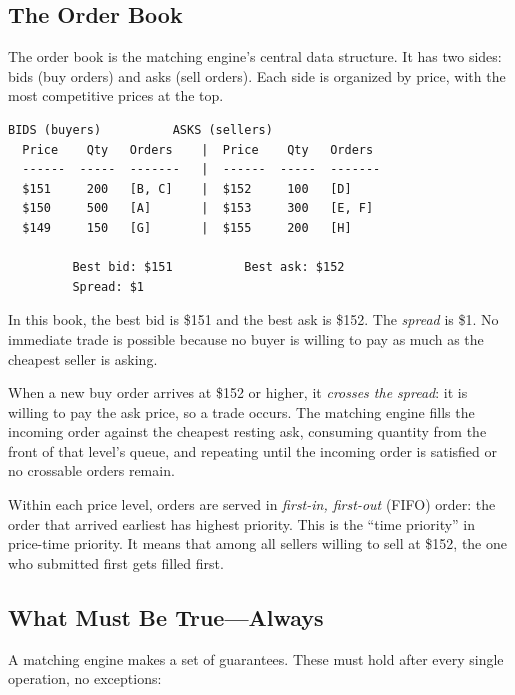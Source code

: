 \documentclass[11pt,a4paper]{article}
\begin{document}
\subsection{The Order Book}
\label{sec:book-intro}

The order book is the matching engine's central data structure. It has
two sides: bids (buy orders) and asks (sell orders). Each side is
organized by price, with the most competitive prices at the top.

\begin{center}
\begin{lstlisting}[language={},basicstyle=\ttfamily\footnotesize,frame=single,xleftmargin=0pt,framexleftmargin=0pt]
         BIDS (buyers)          ASKS (sellers)
  Price    Qty   Orders    |  Price    Qty   Orders
  ------  -----  -------   |  ------  -----  -------
  $151     200   [B, C]    |  $152     100   [D]
  $150     500   [A]       |  $153     300   [E, F]
  $149     150   [G]       |  $155     200   [H]

         Best bid: $151          Best ask: $152
         Spread: $1
\end{lstlisting}
\end{center}

In this book, the best bid is \$151 and the best ask is \$152. The
\emph{spread} is \$1. No immediate trade is possible because no buyer
is willing to pay as much as the cheapest seller is asking.

When a new buy order arrives at \$152 or higher, it \emph{crosses the
spread}: it is willing to pay the ask price, so a trade occurs. The
matching engine fills the incoming order against the cheapest resting
ask, consuming quantity from the front of that level's queue, and
repeating until the incoming order is satisfied or no crossable orders
remain.

Within each price level, orders are served in \emph{first-in,
first-out} (FIFO) order: the order that arrived earliest has
highest priority. This is the ``time priority'' in price-time priority.
It means that among all sellers willing to sell at \$152, the one who
submitted first gets filled first.

\subsection{What Must Be True---Always}
\label{sec:invariants-intro}

A matching engine makes a set of guarantees. These must hold after
every single operation, no exceptions:
\end{document}
